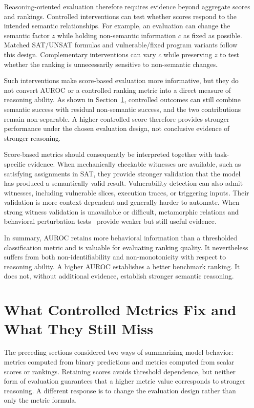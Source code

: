 \documentclass[acmsmall,screen,review,anonymous]{acmart}
\begin{document}
Reasoning-oriented evaluation therefore requires evidence beyond aggregate
scores and rankings. Controlled interventions can test whether scores respond
to the intended semantic relationships. For example, an evaluation can change
the semantic factor \(z\) while holding non-semantic information \(c\) as
fixed as possible. Matched SAT/UNSAT formulas and vulnerable/fixed program
variants follow this design. Complementary interventions can vary \(c\) while
preserving \(z\) to test whether the ranking is unnecessarily sensitive to
non-semantic changes.

Such interventions make score-based evaluation more informative, but they do
not convert AUROC or a controlled ranking metric into a direct measure of
reasoning ability. As shown in Section~\ref{sec:controlled-metrics},
controlled outcomes can still combine semantic success with residual
non-semantic success, and the two contributions remain non-separable. A
higher controlled score therefore provides stronger performance under the
chosen evaluation design, not conclusive evidence of stronger reasoning.

Score-based metrics should consequently be interpreted together with
task-specific evidence. When mechanically checkable witnesses are available,
such as satisfying assignments in SAT, they provide stronger validation that
the model has produced a semantically valid result. Vulnerability detection
can also admit witnesses, including vulnerable slices, execution traces, or
triggering inputs. Their validation is more context dependent and generally
harder to automate. When strong witness validation is unavailable or
difficult, metamorphic relations and behavioral perturbation
tests~\cite{Chen2018MetamorphicSurvey,Ribeiro2020CheckList}
provide weaker but still useful evidence.

In summary, AUROC retains more behavioral information than a thresholded
classification metric and is valuable for evaluating ranking quality. It
nevertheless suffers from both non-identifiability and non-monotonicity with
respect to reasoning ability. A higher AUROC establishes a better benchmark
ranking. It does not, without additional evidence, establish stronger
semantic reasoning.

\section{What Controlled Metrics Fix and What They Still Miss}
\label{sec:controlled-metrics}

The preceding sections considered two ways of summarizing model behavior:
metrics computed from binary predictions and metrics computed from scalar
scores or rankings. Retaining scores avoids threshold dependence, but neither
form of evaluation guarantees that a higher metric value corresponds to
stronger reasoning. A different response is to change the evaluation design
rather than only the metric formula.
\end{document}
